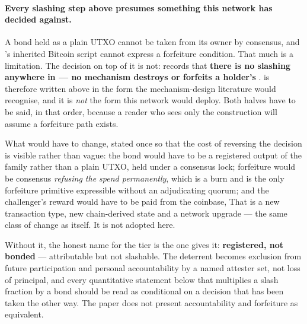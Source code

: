 \paragraph{Every slashing step above presumes something this network has decided against.} A bond
held as a plain UTXO cannot be taken from its owner by consensus, and \Flux's inherited Bitcoin
script cannot express a forfeiture condition. That much is a limitation. The decision on top of it is
not:  records that \textbf{there is no slashing anywhere in \Flux{} --- no mechanism
destroys or forfeits a holder's \flux{}} .  is
therefore written above in the form the mechanism-design literature would recognise, and it is
\emph{not} the form this network would deploy. Both halves have to be said, in that order, because a
reader who sees only the construction will assume a forfeiture path exists.

What would have to change, stated once so that the cost of reversing the decision is visible rather
than vague: the bond would have to be a registered output of the \FluxNode{} family rather than a
plain UTXO, held under a consensus lock; forfeiture would be consensus \emph{refusing the spend
permanently}, which is a burn and is the only forfeiture primitive expressible without an
adjudicating quorum; and the challenger's reward would have to be paid from the coinbase, 
That is a new transaction type, new chain-derived state and a network upgrade --- the same class of
change as \PNR{} itself. It is not adopted here.

Without it, the honest name for the tier is the one  gives it: \textbf{registered,
not bonded} --- attributable but not slashable. The deterrent becomes exclusion from future
participation and personal accountability by a named attester set, not loss of principal, and every
quantitative statement below that multiplies a slash fraction by a bond should be read as conditional
on a decision that has been taken the other way. The paper does not present accountability and
forfeiture as equivalent.


